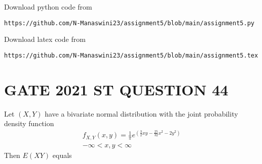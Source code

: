 \documentclass[journal,12pt,twocolumn]{IEEEtran}
\begin{document}
\renewcommand{\thefigure}{\theenumi}
\renewcommand{\thetable}{\theenumi}
Download python code from 
\begin{lstlisting}
https://github.com/N-Manaswini23/assignment5/blob/main/assignment5.py
\end{lstlisting}
%
Download latex code from 
\begin{lstlisting}
https://github.com/N-Manaswini23/assignment5/blob/main/assignment5.tex
\end{lstlisting}
%

\section*{GATE 2021 ST QUESTION 44}
Let $(X,Y)$ have a bivariate normal distribution with the joint probability density function
\begin{align}
f_{X,Y}(x,y)=\frac{1}{\pi}e^{(\frac{3}{2}xy-\frac{25}{32}x^2-2y^2)}\\
-\infty < x,y < \infty
\end{align}
Then $E(XY)$ equals 
\end{document}
